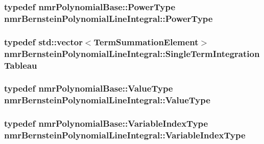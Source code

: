 \hypertarget{classnmr_bernstein_polynomial_line_integral_a0e07aee2cb7c5f3f5d2c1f95cd4e9abf}{
\subsubsection[{Power\-Type}]{\setlength{\rightskip}{0pt plus 5cm}typedef {\bf nmr\-Polynomial\-Base\-::\-Power\-Type} {\bf nmr\-Bernstein\-Polynomial\-Line\-Integral\-::\-Power\-Type}}}\label{classnmr_bernstein_polynomial_line_integral_a0e07aee2cb7c5f3f5d2c1f95cd4e9abf}
\hypertarget{classnmr_bernstein_polynomial_line_integral_a1d31908eb8195d1c00427f12dee7fe6b}{
\subsubsection[{Single\-Term\-Integration\-Tableau}]{\setlength{\rightskip}{0pt plus 5cm}typedef std\-::vector$<${\bf Term\-Summation\-Element}$>$ {\bf nmr\-Bernstein\-Polynomial\-Line\-Integral\-::\-Single\-Term\-Integration\-Tableau}\hspace{0.3cm}{\ttfamily [protected]}}}\label{classnmr_bernstein_polynomial_line_integral_a1d31908eb8195d1c00427f12dee7fe6b}
\hypertarget{classnmr_bernstein_polynomial_line_integral_ab1d3f80540e0791f359e53b3ef074a86}{
\subsubsection[{Value\-Type}]{\setlength{\rightskip}{0pt plus 5cm}typedef {\bf nmr\-Polynomial\-Base\-::\-Value\-Type} {\bf nmr\-Bernstein\-Polynomial\-Line\-Integral\-::\-Value\-Type}}}\label{classnmr_bernstein_polynomial_line_integral_ab1d3f80540e0791f359e53b3ef074a86}
\hypertarget{classnmr_bernstein_polynomial_line_integral_a125fa9ed7f5718e92272974aee68b27a}{
\subsubsection[{Variable\-Index\-Type}]{\setlength{\rightskip}{0pt plus 5cm}typedef {\bf nmr\-Polynomial\-Base\-::\-Variable\-Index\-Type} {\bf nmr\-Bernstein\-Polynomial\-Line\-Integral\-::\-Variable\-Index\-Type}}}\label{classnmr_bernstein_polynomial_line_integral_a125fa9ed7f5718e92272974aee68b27a}
